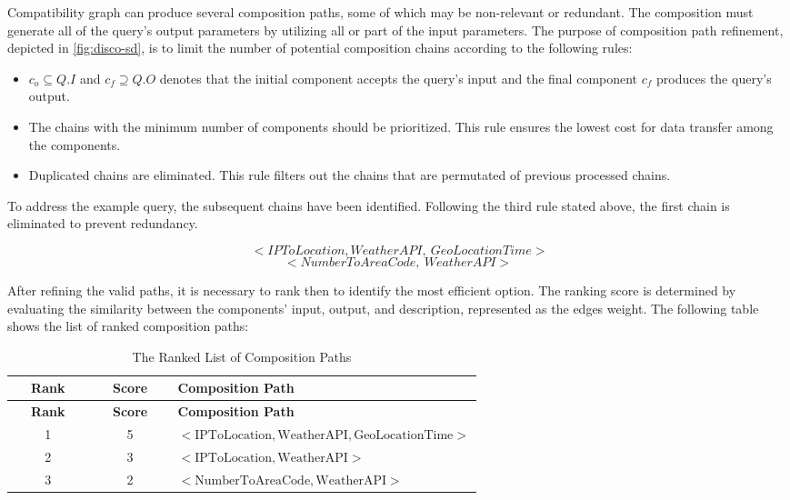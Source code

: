 Compatibility graph can produce several composition paths, some of which may be non-relevant or redundant. The composition must generate all of the query’s output parameters by utilizing all or part of the input parameters. The purpose of composition path refinement, depicted in \cref{fig:disco-sd}, is to limit the number of potential composition chains according to the following rules:

\begin{itemize}
\item
  \(c_{o} \subseteq Q.I\) and \(c_{f} \supseteq Q.O\) denotes that the
  initial component accepts the query's input and the final component
  \(c_{f}\) produces the query's output.
\item
  The chains with the minimum number of components should be
  prioritized. This rule ensures the lowest cost for data transfer among
  the components.
\item
  Duplicated chains are eliminated. This rule filters out the chains
  that are permutated of previous processed chains.
\end{itemize}

To address the example query, the subsequent chains have been identified. Following the third rule stated above, the first chain is eliminated to prevent redundancy.

\[< IPToLocation,WeatherAPI >\]
\[\  < IPToLocation,WeatherAPI,\ GeoLocationTime >\]
\[< NumberToAreaCode,\ WeatherAPI >\]

After refining the valid paths, it is necessary to rank then to identify
the most efficient option. The ranking score is determined by evaluating
the similarity between the components' input, output, and description,
represented as the edge\textquotesingle s weight. The following table
shows the list of ranked composition paths:

\hypertarget{tbl:disco-composition-paths}{}
\begin{longtable}{@{}ccp{0.65\linewidth}@{}}
\caption{\label{tbl:disco-composition-paths}The Ranked List of Composition Paths}\tabularnewline
\toprule
\textbf{Rank} & \textbf{Score} & \textbf{Composition Path} \tabularnewline
\midrule
\endfirsthead

\toprule
\textbf{Rank} & \textbf{Score} & \textbf{Composition Path} \tabularnewline
\midrule
\endhead

1 & 5 & \(< \text{IPToLocation}, \text{WeatherAPI}, \text{GeoLocationTime} >\) \tabularnewline
2 & 3 & \(< \text{IPToLocation}, \text{WeatherAPI} >\) \tabularnewline
3 & 2 & \(< \text{NumberToAreaCode}, \text{WeatherAPI} >\) \tabularnewline

\bottomrule
\end{longtable}

